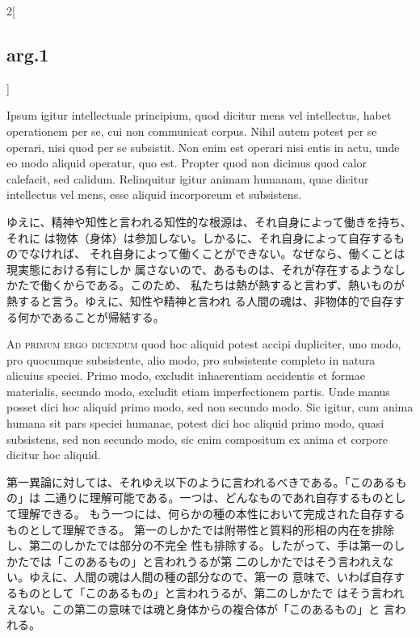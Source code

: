 \documentclass[paper=a4paper,fontsize=10pt,jafontsize=9pt,titlepage]{jlreq}
\begin{document}
\begin{paracol}{2}[\subsection{arg.1}]
\switchcolumn*

 Ipsum igitur intellectuale principium, quod dicitur mens vel intellectus, habet
 operationem per se, cui non communicat corpus. Nihil autem potest per se
 operari, nisi quod per se subsistit. Non enim est operari nisi entis in actu,
 unde eo modo aliquid operatur, quo est. Propter quod non dicimus quod calor
 calefacit, sed calidum. Relinquitur igitur animam humanam, quae dicitur
 intellectus vel mens, esse aliquid incorporeum et subsistens.

\switchcolumn

 ゆえに、精神や知性と言われる知性的な根源は、それ自身によって働きを持ち、それに
 は物体（身体）は参加しない。しかるに、それ自身によって自存するものでなければ、
 それ自身によって働くことができない。なぜなら、働くことは現実態における有にしか
 属さないので、あるものは、それが存在するようなしかたで働くからである。このため、
 私たちは熱が熱すると言わず、熱いものが熱すると言う。ゆえに、知性や精神と言われ
 る人間の魂は、非物体的で自存する何かであることが帰結する。

\switchcolumn*[\subsection{ad 1}]

 {\scshape Ad primum ergo dicendum} quod hoc aliquid potest accipi dupliciter,
 uno modo, pro quocumque subsistente, alio modo, pro subsistente completo in
 natura alicuius speciei. Primo modo, excludit inhaerentiam accidentis et formae
 materialis, secundo modo, excludit etiam imperfectionem partis. Unde manus
 posset dici hoc aliquid primo modo, sed non secundo modo. Sic igitur, cum anima
 humana sit pars speciei humanae, potest dici hoc aliquid primo modo, quasi
 subsistens, sed non secundo modo, sic enim compositum ex anima et corpore
 dicitur hoc aliquid.

\switchcolumn

 第一異論に対しては、それゆえ以下のように言われるべきである。「このあるもの」は
 二通りに理解可能である。一つは、どんなものであれ自存するものとして理解できる。
 もう一つには、何らかの種の本性において完成された自存するものとして理解できる。
 第一のしかたでは附帯性と質料的形相の内在を排除し、第二のしかたでは部分の不完全
 性も排除する。したがって、手は第一のしかたでは「このあるもの」と言われうるが第
 二のしかたではそう言われえない。ゆえに、人間の魂は人間の種の部分なので、第一の
 意味で、いわば自存するものとして「このあるもの」と言われうるが、第二のしかたで
 はそう言われえない。この第二の意味では魂と身体からの複合体が「このあるもの」と
 言われる。


\end{paracol}
\end{document}

